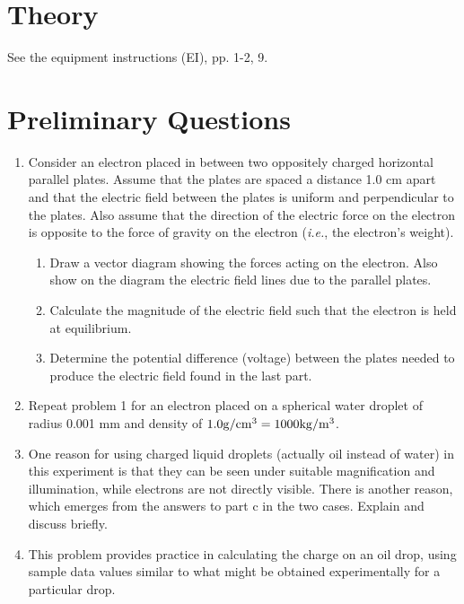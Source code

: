 
\section{Theory}

See the equipment instructions (EI), pp. 1-2, 9.

\section{Preliminary Questions}

\begin{enumerate}
\item Consider an electron placed in between two oppositely charged
horizontal parallel plates.  Assume that the plates are spaced a
distance 1.0 cm apart and that the electric field between the plates is
uniform and perpendicular to the plates.  Also assume that the
direction of the electric force on the electron is opposite to the
force of gravity on the electron ({\em i.e.}, the electron's
weight).
	\begin{enumerate}
	\item Draw a vector diagram showing the forces acting on the electron.  Also
show on the diagram the electric field lines due to the parallel plates.
	\item Calculate the magnitude of the electric field such that the electron is
held at equilibrium.
	\item Determine the potential difference (voltage) between the plates needed
to produce the electric field found in the last part.
	\end{enumerate}

\item Repeat problem 1 for an electron placed on a spherical
water droplet of radius 0.001 mm and density of $1.0 {\rm g}/{\rm cm}^3 = 1000 {\rm kg}/{\rm m}^3$.

\item One reason for using charged liquid droplets (actually oil instead of
water) in this experiment is 
that they can be seen under suitable magnification and illumination,
while electrons are not directly visible.  There is another reason,
which emerges from the answers to part c in the two cases. Explain and
discuss briefly.

\item This problem provides practice in calculating the charge on
an oil drop, using sample data values similar to what might be obtained
experimentally for a particular drop.
\end{enumerate}


